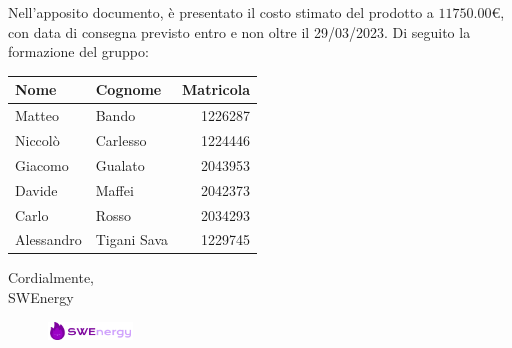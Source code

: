 Nell’apposito documento, è presentato il costo stimato del prodotto a 
$11750.00$€, 
con data di consegna previsto entro e non oltre il 29/03/2023. Di seguito la
formazione del gruppo:

\begin{center}
{
\renewcommand{\arraystretch}{1.5}
\begin{tabular}{llr}
	\textbf{Nome} & \textbf{Cognome}	& \textbf{Matricola}		\\
	\toprule
	Matteo		&	Bando				&	1226287					\\
	Niccolò 	&	Carlesso		 	& 	1224446					\\
	Giacomo 	&	Gualato			 	& 	2043953					\\
	Davide		&	Maffei			 	& 	2042373					\\
	Carlo		&	Rosso			 	&	2034293					\\
	Alessandro	&	Tigani Sava		 	&	1229745					\\
	\bottomrule
\end{tabular}
}
\end{center}

\vspace{1cm}

\noindent
Cordialmente, \\
SWEnergy

\begin{figure}[H]
	\includegraphics[width=0.2\textwidth]{img/sign.png}
\end{figure}

